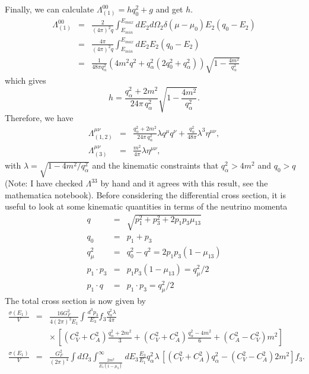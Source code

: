 \documentclass[12pt,letter]{article}
\begin{document}
Finally, we can calculate $\Lambda_{(1)}^{00} = h q_0^2 + g$ and get $h$.  
\begin{eqnarray*}
\Lambda_{(1)}^{00} &=& \frac{2}{(4 \pi)^2 q}\int_{E_{min}}^{E_{max}} dE_2 
d\Omega_2 \delta(\mu-\mu_0)  
E_2(q_0 - E_2) \\
&=& \frac{4 \pi}{(4 \pi)^2 q}\int_{E_{min}}^{E_{max}} dE_2 
E_2(q_0 - E_2) \\
&=& \frac{1}{48 \pi q_\alpha^2 }
\left(4 m^2 q^2 + q_\alpha^2(2q_0^2 + q_\alpha^2) \right)  
\sqrt{1-\frac{4m^2}{q_\alpha^2}}
\end{eqnarray*}  
which gives 
\begin{equation*}
h = \frac{q_\alpha^2 + 2 m^2}{24 \pi \, q_\alpha^2} \sqrt{1 - \frac{4m^2}{q_\alpha^2}}.
\end{equation*}
Therefore, we have 
\begin{eqnarray*}
\Lambda_{(1,2)}^{\mu\nu} &=&
\frac{q_\alpha^2 + 2 m^2}{24 \pi \, q_\alpha^2} \lambda
q^\mu q^\nu
+  \frac{q_\alpha^2}{48 \pi} 
\lambda^3 \eta^{\mu \nu}, \\
\Lambda_{(3)}^{\mu\nu} &=& \frac{m^2}{4 \pi} 
\lambda \eta^{\mu \nu},
\end{eqnarray*}
with $\lambda = \sqrt{1 - 4m^2/q_\alpha^2}$ and the kinematic constraints that $q_\alpha^2 > 4m^2$ and $q_0>q$ (Note: I have checked $\Lambda^{33}$ by hand and it agrees with this result, see the mathematica notebook).  Before considering the differential cross section, it is useful to look at some kinematic quantities in terms of the neutrino momenta 
\begin{eqnarray*}
q &=& \sqrt{p_1^2 + p_3^2 + 2 p_1 p_3 \mu_{13}} \\
q_0 &=& p_1 + p_3 \\
q_\mu^2 &=& q_0^2 - q^2 = 2 p_1 p_3(1-\mu_{13}) \\ 
p_1 \cdot p_3 &=& p_1 p_3 (1-\mu_{13}) = q_\mu^2/2 \\
p_1 \cdot q &=& p_1 \cdot p_3 = q_\mu^2/2
\end{eqnarray*}
The total cross section is now given by 
\begin{eqnarray*}
\frac{\sigma(E_1)}{V} &=& \frac{16 G_F^2}{4 (2 \pi)^3 E_1}  
\int \frac{d^3p_3}{E_3} f_3 \frac{q_\alpha^2 \lambda}{4 \pi} \\
&&\times \, \left[ 
 (C_V^2+C_A^2) \frac{q_\alpha^2 + 2 m^2}{3}
+(C_V^2+C_A^2) \frac{q_\alpha^2 - 4 m^2}{6} 
+(C_A^2-C_V^2) m^2 \right] \\
\frac{\sigma(E_1)}{V} &=& \frac{G_F^2}{(2 \pi)^4}  
\int d\Omega_3 \int_{\frac{2 m^2}{E_1 (1-\mu_3)}}^\infty dE_3 \frac{E_3}{E_1}
 q_\alpha^2 \lambda \, \left[(C_V^2+C_A^2) q_\alpha^2 
 - (C_V^2-C_A^2) 2 m^2 \right]f_3.
\end{eqnarray*}
\end{document}
